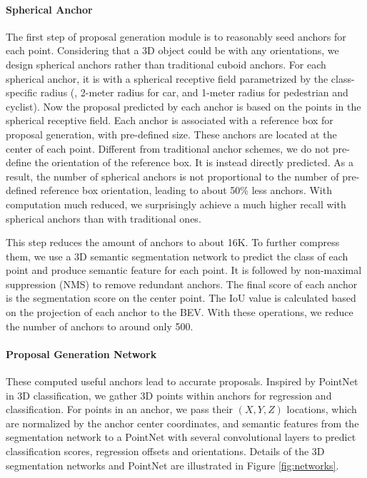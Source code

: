 \documentclass[10pt,twocolumn,letterpaper]{article}
\begin{document}
\vspace{-0.1in}
\paragraph{Spherical Anchor} The first step of proposal generation module is to reasonably seed anchors for each point. Considering that a 3D object could be with any orientations, we design spherical anchors rather than traditional cuboid anchors. For each spherical anchor, it is with a spherical receptive field parametrized by the class-specific radius (\ie, 2-meter radius for car, and 1-meter radius for pedestrian and cyclist). Now the proposal predicted by each anchor is based on the points in the spherical receptive field. Each anchor is associated with a reference box for proposal generation, with pre-defined size. These anchors are located at the center of each point. Different from traditional anchor schemes, we do not pre-define the orientation of the reference box. It is instead directly predicted. As a result, the number of spherical anchors is not proportional to the number of pre-defined reference box orientation, leading to about 50\% less anchors. With computation much reduced, we surprisingly achieve a much higher recall with spherical anchors than with traditional ones.


This step reduces the amount of anchors to about 16K. To further compress them, we use a 3D semantic segmentation network to predict the class of each point and produce semantic feature for each point. It is followed by non-maximal suppression (NMS) to remove redundant anchors.
The final score of each anchor is the segmentation score on the center point. The IoU value is calculated based on the projection of each anchor to the BEV. With these operations, we reduce the number of anchors to around only 500.

\vspace{-0.1in}
\paragraph{Proposal Generation Network}
\label{paragraph_proposla_generation_network}
These computed useful anchors lead to accurate proposals. Inspired by PointNet \cite{POINTNET} in 3D classification, we gather 3D points within anchors for regression and classification. For points in an anchor, we pass their $(X,Y,Z)$ locations, which are normalized by the anchor center coordinates, and semantic features from the segmentation network to a PointNet with several convolutional layers to predict classification scores, regression offsets and orientations. Details of the 3D segmentation networks and PointNet are illustrated in Figure \ref{fig:networks}. 
\end{document}
